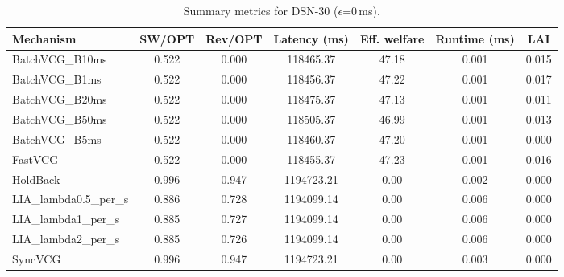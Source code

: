 \begin{table}[t]
\centering
\small
\setlength{\tabcolsep}{6pt}
\begin{tabular}{lcccccc}
\toprule
Mechanism & SW/OPT & Rev/OPT & Latency (ms) & Eff. welfare & Runtime (ms) & LAI \\
\midrule
BatchVCG_B10ms & 0.522 & 0.000 & 118465.37 & 47.18 & 0.001 & 0.015 \\
BatchVCG_B1ms & 0.522 & 0.000 & 118456.37 & 47.22 & 0.001 & 0.017 \\
BatchVCG_B20ms & 0.522 & 0.000 & 118475.37 & 47.13 & 0.001 & 0.011 \\
BatchVCG_B50ms & 0.522 & 0.000 & 118505.37 & 46.99 & 0.001 & 0.013 \\
BatchVCG_B5ms & 0.522 & 0.000 & 118460.37 & 47.20 & 0.001 & 0.000 \\
FastVCG & 0.522 & 0.000 & 118455.37 & 47.23 & 0.001 & 0.016 \\
HoldBack & 0.996 & 0.947 & 1194723.21 & 0.00 & 0.002 & 0.000 \\
LIA_lambda0.5_per_s & 0.886 & 0.728 & 1194099.14 & 0.00 & 0.006 & 0.000 \\
LIA_lambda1_per_s & 0.885 & 0.727 & 1194099.14 & 0.00 & 0.006 & 0.000 \\
LIA_lambda2_per_s & 0.885 & 0.726 & 1194099.14 & 0.00 & 0.006 & 0.000 \\
SyncVCG & 0.996 & 0.947 & 1194723.21 & 0.00 & 0.003 & 0.000 \\
\bottomrule
\end{tabular}
\caption{Summary metrics for DSN-30 ($\epsilon$=0\,ms).}
\label{tab:dsn30_eps0p0}
\end{table}
